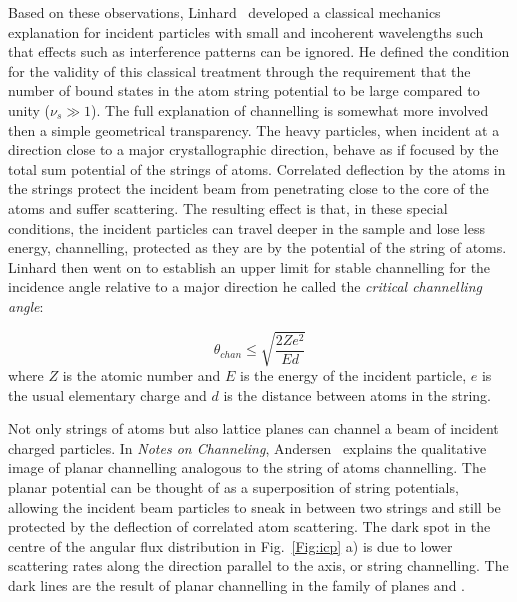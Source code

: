 Based on these observations, Linhard~\cite{Lindhard65} developed a classical mechanics explanation for incident particles with small and incoherent wavelengths such that effects such as interference patterns can be ignored. He defined the condition for the validity of this classical treatment through the requirement that the number of bound states in the atom string potential to be large compared to unity ($\nu_s\gg1$). The full explanation of channelling is somewhat more involved then a simple geometrical transparency. The heavy particles, when incident at a direction close to a major crystallographic direction, behave as if focused by the total sum potential of the strings of atoms. Correlated deflection by the atoms in the strings protect the incident beam from penetrating close to the core of the atoms and suffer scattering. The resulting effect is that, in these special conditions, the incident particles can travel deeper in the sample and lose less energy, channelling, protected as they are by the potential of the string of atoms. Linhard then went on to establish an  upper limit for stable channelling for the incidence angle relative to a major direction he called the \textit{critical channelling angle}:

\begin{equation}
\theta_{chan} \leq \sqrt{\frac{2 Z e^2}{E d}} 
\end{equation} 
where $Z$ is the atomic number and $E$ is the energy of the incident particle, $e$ is the usual elementary charge and $d$ is the distance between atoms in the string.

Not only strings of atoms but also lattice planes can channel a beam of incident charged particles. In \textit{Notes on Channeling}, Andersen~\cite{Andersen14} explains the qualitative image of planar channelling analogous to the string of atoms channelling. The planar potential can be thought of as a superposition of string potentials, allowing the incident beam particles to sneak in between two strings and still be protected by the deflection of correlated atom scattering. The dark spot in the centre of the angular flux distribution in  Fig.~\ref{Fig:icp} a) is due to lower scattering rates along the direction parallel to the \hkl[001] axis, or string channelling. The dark lines are the result of planar channelling in the family of planes  and .    



